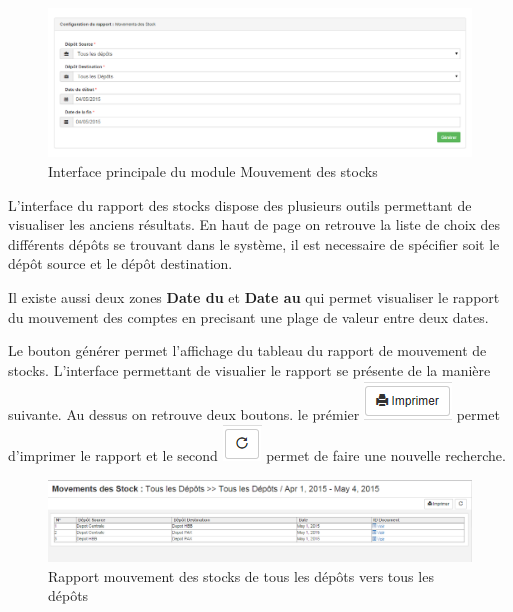 \documentclass[12pt,a4paper]{report}
\begin{document}
\begin{figure}[h]
\begin{center}
\includegraphics[width=14cm]{pic/RapMouvStock.png}
\end{center}
\caption{Interface principale du module Mouvement des stocks}
\label{Interface principale du module Mouvement des stocks}
\end{figure}

L'interface du rapport des stocks dispose des plusieurs outils permettant de visualiser les anciens résultats. En haut de page on retrouve la liste de choix des différents dépôts se trouvant dans le système, il est necessaire de spécifier soit le dépôt source et le dépôt destination.

Il existe aussi deux zones \textbf{Date du} et \textbf{Date au} qui permet visualiser le rapport du mouvement des comptes en precisant une plage de valeur entre deux dates.

Le bouton générer permet l'affichage du tableau du rapport de mouvement de stocks. L'interface permettant de visualier le rapport se présente de la manière suivante. Au dessus on retrouve deux boutons. le prémier 
\includegraphics[scale=0.7]{pic/Print.png} permet d'imprimer le rapport et le second \includegraphics[scale=0.7]{pic/refresh.png} permet de faire une nouvelle recherche.

\begin{figure}[h]
\begin{center}
\includegraphics[width=14cm]{pic/MouveAllStock.png}
\end{center}
\caption{Rapport mouvement des stocks de tous les dépôts vers tous les dépôts}
\label{Rapport mouvement des stocks de tous les dépôts vers tous les dépôts}
\end{figure}
\end{document}
